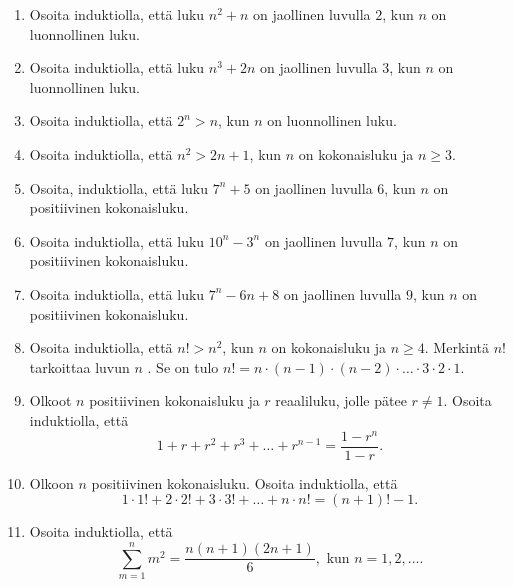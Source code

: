 \Harjoitustehtavat




\begin{enumerate}

\item Osoita induktiolla, että luku $n^2+n$ on jaollinen luvulla $2$, kun $n$ on luonnollinen luku.

\item Osoita induktiolla, että luku $n^3+2n$ on jaollinen luvulla $3$, kun $n$ on luonnollinen luku.

\item Osoita induktiolla, että $2^n > n$, kun $n$ on luonnollinen luku.

\item Osoita induktiolla, että $n^2 > 2n + 1$, kun $n$ on kokonaisluku ja $n \ge 3$.

\item Osoita, induktiolla, että luku $7^n + 5$ on jaollinen luvulla $6$, kun $n$ on positiivinen kokonaisluku.

\item Osoita induktiolla, että luku $10^n - 3^n$ on jaollinen luvulla $7$, kun $n$ on positiivinen kokonaisluku.

\item Osoita induktiolla, että luku $7^n - 6n + 8$ on jaollinen luvulla $9$, kun $n$ on positiivinen kokonaisluku.

\item Osoita induktiolla, että $n! > n^2$, kun $n$ on kokonaisluku ja $n \ge 4$. Merkintä $n!$ tarkoittaa luvun $n$ . Se on tulo $n! = n \cdot (n-1) \cdot (n-2) \cdot \ldots \cdot 3 \cdot 2 \cdot 1$.

\item Olkoot $n$ positiivinen kokonaisluku ja $r$ reaaliluku, jolle pätee $r \neq 1$. Osoita induktiolla, että 
\[
1 + r + r^2 + r^3 + \ldots + r^{n-1} = \frac{1-r^n}{1-r}.
\]

\item Olkoon $n$ positiivinen kokonaisluku. Osoita induktiolla, että 
\[
1 \cdot 1! + 2 \cdot 2! + 3 \cdot 3! + \ldots + n \cdot n! = (n + 1)! - 1.
\]

\item 
Osoita induktiolla, että 
\[
\sum_{m=1}^n m^2= \frac{n(n+1)(2n+1)}{6}, \textrm{ kun } n=1, 2, \ldots.
\]


\end{enumerate}
